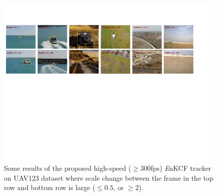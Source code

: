 \documentclass{bmvc2k}
\begin{document}
\begin{figure}[!t]
\includegraphics[width=\textwidth]{figures/ResultsIntroduction.pdf}
\caption{Some results of the proposed high-speed ($\geq300$fps) {\it E}nKCF tracker on UAV123 dataset where scale change between the frame in the top row and bottom row is large ($\leq0.5$, or $\geq2$).}
\label{ResultsIntroduction}
\end{figure}
\end{document}
